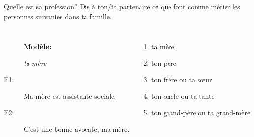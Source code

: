 \begin{frame}{Quelle est sa profession?}
  Dis à ton/ta partenaire ce que font comme métier les personnes suivantes dans ta famille. \\
  \begin{columns}
      \begin{description}
        \item[] \textbf{Modèle:}
        \item[] \emph{ta mère}
        \item[E1:] Ma mère est assistante sociale.
        \item[] 
        \item[E2:] C'est une bonne avocate, ma mère.
        \item[] 
      \end{description}
      \begin{enumerate}
        \item ta mère
        \item ton père
        \item ton frère ou ta sœur
        \item ton oncle ou ta tante
        \item ton grand-père ou ta grand-mère
      \end{enumerate}
  \end{columns}
\end{frame}